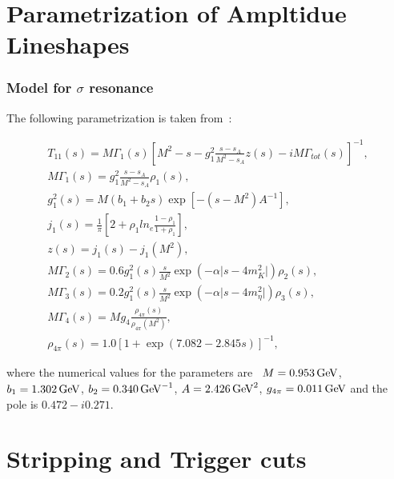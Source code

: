 
\section{Parametrization of Ampltidue Lineshapes}
\label{sec:AmpLineShapes}

\subsubsection{Model for $\sigma$ resonance}

The following parametrization is taken from~\cite{BuggSigma}:

\begin{eqnarray}
T_{11}(s) = M\Gamma_{1}(s)[M^{2} - s - g^{2}_{1}\frac{s - s_{A}}{M^{2} - s_{A}} z(s) -iM\Gamma_{tot}(s)]^{-1},\\
M\Gamma_{1}(s) = g^{2}_{1}\frac{s - s_{A}}{M^{2} - s_{A}}\rho_{1}(s),\\
g^{2}_{1}(s) = M(b_{1} + b_{2}s)\exp[-(s-M^{2})A^{-1}],\\
j_{1}(s) = \frac{1}{\pi}[2 + \rho_{1}ln_{e}\frac{1 - \rho_{1}}{1 + \rho_{1}}],\\
z(s) = j_{1}(s) - j_{1}(M^{2}),\\
M\Gamma_{2}(s) = 0.6 g^{2}_{1}(s)\frac{s}{M^{2}}\exp(-\alpha \vert s - 4m^{2}_{K}\vert)\rho_{2}(s),\\
M\Gamma_{3}(s) = 0.2 g^{2}_{1}(s)\frac{s}{M^{2}}\exp(-\alpha \vert s - 4m^{2}_{\eta}\vert)\rho_{3}(s),\\
M\Gamma_{4}(s) = M g_{4}\frac{\rho_{4\pi}(s)}{\rho_{4\pi}(M^{2})},\\
\rho_{4\pi}(s) = 1.0 [1 + \exp(7.082 - 2.845 s)]^{-1},
\end{eqnarray}

where the numerical values for the parameters are~\cite{BuggSigma} $M = 0.953 \mathrm{\,Ge\kern -0.1em V}$, $b_{1} = 1.302 \mathrm{\,Ge\kern -0.1em V}$, $b_{2} = 0.340 \mathrm{\,Ge\kern -0.1em V}^{-1}$, $A = 2.426 \mathrm{\,Ge\kern -0.1em V}^{2}$, $g_{4\pi} = 0.011 \mathrm{\,Ge\kern -0.1em V}$ and the pole is $0.472 - i0.271$.



\section{Stripping and Trigger cuts}
\label{sec:StripAndTrigger}

\setcounter{figure}{0}
\setcounter{table}{0}
\renewcommand{\thefigure}{A.\arabic{figure}}
\renewcommand{\thetable}{A.\arabic{table}}

